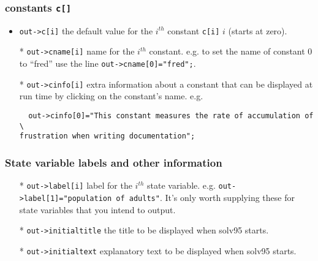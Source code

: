 \documentclass[10pt] {article}
\begin{document}
\subsubsection{constants {\tt c[]}}
\begin{itemize}
\item \verb+out->c[i]+ the default value for the $i^{th}$ constant \verb+c[i]+ $i $ (starts at %
zero).
\item[*] \verb+out->cname[i]+ name for the $i^{th}$ constant. e.g. to set the name of constant 0 %
to ``fred'' use the line \verb+out->cname[0]="fred";+.
\item[*] \verb+out->cinfo[i]+ extra information about a constant that can be displayed at run %
time by clicking on the constant's name. e.g. 
\begin{verbatim}
  out->cinfo[0]="This constant measures the rate of accumulation of \
frustration when writing documentation";
\end{verbatim}
\end{itemize} 
\subsubsection{State variable labels and other information}
\begin{itemize}
\item[*] \verb+out->label[i]+ label for the $i^{th}$ state variable. e.g.
       \verb+out->label[1]="population of adults"+. It's only worth supplying these for state %
variables that you intend to output.
\item[*] \verb+out->initialtitle+ the title to be displayed when solv95 starts.
\item[*] \verb+out->initialtext+ explanatory text to be displayed when solv95 starts.
\end{itemize}
\end{document}
